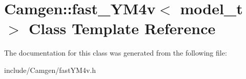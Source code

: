 \hypertarget{a00216}{\section{Camgen\-:\-:fast\-\_\-\-Y\-M4v$<$ model\-\_\-t $>$ Class Template Reference}
\label{a00216}
}


The documentation for this class was generated from the following file\-:\begin{DoxyCompactItemize}
\item 
include/\-Camgen/fast\-Y\-M4v.\-h\end{DoxyCompactItemize}
